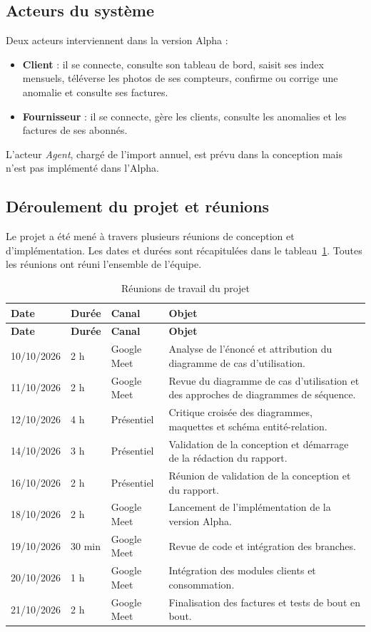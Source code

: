 \subsection{Acteurs du système}

Deux acteurs interviennent dans la version Alpha :

\begin{itemize}[leftmargin=*]
  \item \textbf{Client} : il se connecte, consulte son tableau de bord, saisit ses index mensuels, téléverse les photos de ses compteurs, confirme ou corrige une anomalie et consulte ses factures.
  \item \textbf{Fournisseur} : il se connecte, gère les clients, consulte les anomalies et les factures de ses abonnés.
\end{itemize}

L'acteur \textit{Agent}, chargé de l'import annuel, est prévu dans la conception mais n'est pas implémenté dans l'Alpha.

\subsection{Déroulement du projet et réunions}

Le projet a été mené à travers plusieurs réunions de conception et d'implémentation. Les dates et durées sont récapitulées dans le tableau~\ref{tab:reunions}. Toutes les réunions ont réuni l'ensemble de l'équipe.

\begin{longtable}{p{}p{}p{}p{}}
\caption{Réunions de travail du projet}\label{tab:reunions}\\
\toprule
\textbf{Date} & \textbf{Durée} & \textbf{Canal} & \textbf{Objet} \\
\midrule
\endfirsthead
\toprule
\textbf{Date} & \textbf{Durée} & \textbf{Canal} & \textbf{Objet} \\
\midrule
\endhead
10/10/2026 & 2 h & Google Meet & Analyse de l'énoncé et attribution du diagramme de cas d'utilisation. \\
11/10/2026 & 2 h & Google Meet & Revue du diagramme de cas d'utilisation et des approches de diagrammes de séquence. \\
12/10/2026 & 4 h & Présentiel & Critique croisée des diagrammes, maquettes et schéma entité-relation. \\
14/10/2026 & 3 h & Présentiel & Validation de la conception et démarrage de la rédaction du rapport. \\
16/10/2026 & 2 h & Présentiel & Réunion de validation de la conception et du rapport. \\
18/10/2026 & 2 h & Google Meet & Lancement de l'implémentation de la version Alpha. \\
19/10/2026 & 30 min & Google Meet & Revue de code et intégration des branches. \\
20/10/2026 & 1 h & Google Meet & Intégration des modules clients et consommation. \\
21/10/2026 & 2 h & Google Meet & Finalisation des factures et tests de bout en bout. \\
\bottomrule
\end{longtable}

